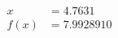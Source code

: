 \documentclass[preview]{standalone}
\begin{document}
\begin{align*}
x &= 4.7631\\f(x) &= 7.9928910
\end{align*}
\end{document}
